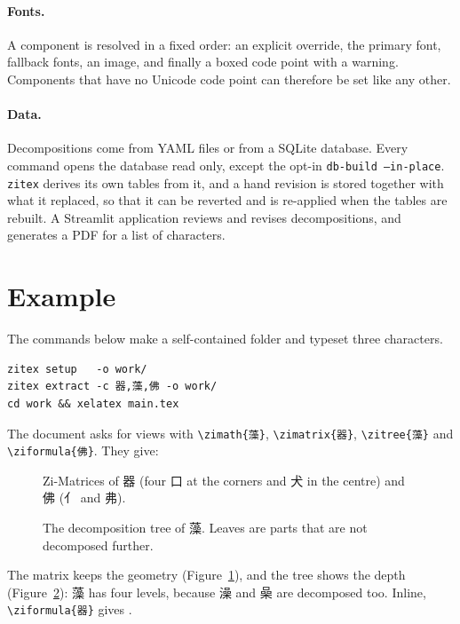\documentclass[11pt]{article}
\newcommand{\cmd}[1]{\texttt{\textbackslash #1}}
\begin{document}
\paragraph{Fonts.} A component is resolved in a fixed order: an explicit override, the primary font, fallback fonts, an image, and finally a boxed code point
with a warning. Components that have no Unicode code point can therefore be set like any other.

\paragraph{Data.} Decompositions come from YAML files or from a SQLite database. Every command opens the database read only, except the opt-in \texttt{db-build --in-place}. \texttt{zitex} derives its own tables from it, and
a hand revision is stored together with what it replaced, so that it can be reverted and is re-applied when the tables are rebuilt.
A Streamlit application reviews and revises decompositions, and generates a PDF for a list of characters.

\section{Example}\label{sec:example}
The commands below make a self-contained folder and typeset three characters.

\begin{verbatim}
zitex setup   -o work/
zitex extract -c 器,藻,佛 -o work/
cd work && xelatex main.tex
\end{verbatim}

The document asks for views with \cmd{zimath}\texttt{\{藻\}}, \cmd{zimatrix}\texttt{\{器\}}, \cmd{zitree}\texttt{\{藻\}}
and \cmd{ziformula}\texttt{\{佛\}}. They give:


\begin{figure}[ht]
\centering
{}\qquad{}
\caption{Zi-Matrices of 器 (four 口 at the corners and 犬 in the centre) and 佛 (亻 and 弗).}
\label{fig:matrix}
\end{figure}

\begin{figure}[ht]
\centering
{}
\caption{The decomposition tree of 藻. Leaves are parts that are not decomposed further.}
\label{fig:tree}
\end{figure}

\noindent The matrix keeps the geometry (Figure~\ref{fig:matrix}), and the tree shows the depth (Figure~\ref{fig:tree}): 藻 has four levels, because 澡 and 喿 are decomposed too.
Inline, \cmd{ziformula}\texttt{\{器\}} gives \unskip.
\end{document}
